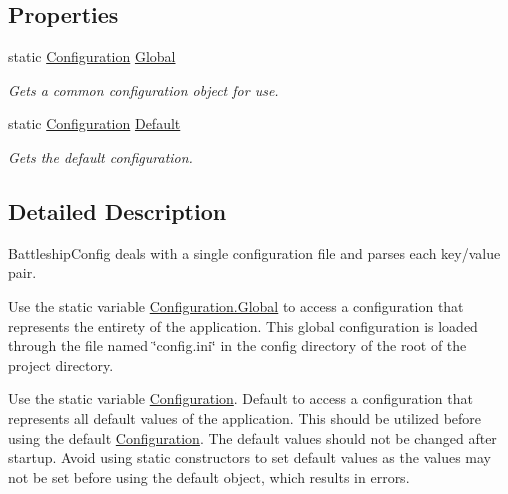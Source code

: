 \subsection*{Properties}
\begin{DoxyCompactItemize}
\item 
\hypertarget{class_m_b_c_1_1_core_1_1_configuration_a4f09a03f95c3beaa3ae10c3ae7aa7624}{static \hyperlink{class_m_b_c_1_1_core_1_1_configuration}{Configuration} \hyperlink{class_m_b_c_1_1_core_1_1_configuration_a4f09a03f95c3beaa3ae10c3ae7aa7624}{Global}}\label{class_m_b_c_1_1_core_1_1_configuration_a4f09a03f95c3beaa3ae10c3ae7aa7624}

\begin{DoxyCompactList}\small\item\em Gets a common configuration object for use.\end{DoxyCompactList}\item 
\hypertarget{class_m_b_c_1_1_core_1_1_configuration_a5db184730b6c51c2ae617d0fc1976c13}{static \hyperlink{class_m_b_c_1_1_core_1_1_configuration}{Configuration} \hyperlink{class_m_b_c_1_1_core_1_1_configuration_a5db184730b6c51c2ae617d0fc1976c13}{Default}}\label{class_m_b_c_1_1_core_1_1_configuration_a5db184730b6c51c2ae617d0fc1976c13}

\begin{DoxyCompactList}\small\item\em Gets the default configuration.\end{DoxyCompactList}\end{DoxyCompactItemize}


\subsection{Detailed Description}
Battleship\-Config deals with a single configuration file and parses each key/value pair. 

Use the static variable \hyperlink{class_m_b_c_1_1_core_1_1_configuration_a4f09a03f95c3beaa3ae10c3ae7aa7624}{Configuration.\-Global} to access a configuration that represents the entirety of the application. This global configuration is loaded through the file named \char`\"{}config.\-ini\char`\"{} in the config directory of the root of the project directory.

Use the static variable \hyperlink{class_m_b_c_1_1_core_1_1_configuration}{Configuration}. Default to access a configuration that represents all default values of the application. This should be utilized before using the default \hyperlink{class_m_b_c_1_1_core_1_1_configuration}{Configuration}. The default values should not be changed after startup. Avoid using static constructors to set default values as the values may not be set before using the default object, which results in errors.

